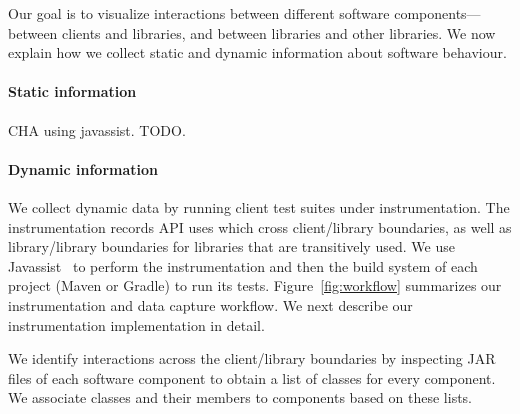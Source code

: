 \label{sec:collecting-data}
Our goal is to visualize interactions between different software components---between
clients and libraries, and between libraries and other libraries. We now explain
how we collect static and dynamic information about software behaviour.

\paragraph{Static information} CHA using javassist. TODO.

\paragraph{Dynamic information} We collect dynamic data by running client
test suites under instrumentation. 
The instrumentation records API
uses which cross client/library boundaries, as well as library/library boundaries
for libraries that are transitively used. We use
Javassist~\cite{chiba00:_load_struc_reflec_java} to perform the
instrumentation and then the build system of each project (Maven or Gradle) to run its
tests. Figure~\ref{fig:workflow} summarizes our instrumentation and
data capture workflow. We next describe our instrumentation implementation in detail.

We identify interactions across the client/library boundaries by
inspecting JAR files of each software component to obtain a list of
classes for every component. We associate classes and their members to
components based on these lists. 

